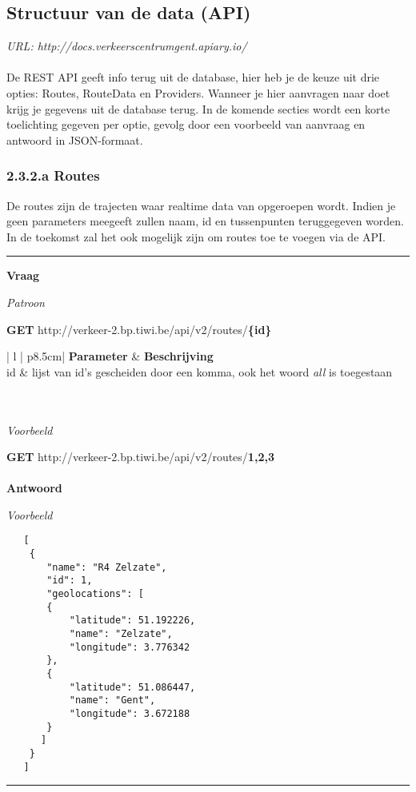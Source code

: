 \documentclass[ps,a4paper,oneside]{report}
\begin{document}
\subsection{Structuur van de data (API)}
\textit{URL: http://docs.verkeerscentrumgent.apiary.io/}\\\\
De REST API geeft info terug uit de database, hier heb je de keuze uit drie opties: Routes, RouteData en Providers. Wanneer je hier aanvragen naar doet krijg je gegevens uit de database terug. In de komende secties wordt een korte toelichting gegeven per optie, gevolg door een voorbeeld van aanvraag en antwoord in JSON-formaat.

\subsubsection{2.3.2.a Routes}
De routes zijn de trajecten waar realtime data van opgeroepen wordt. Indien je geen parameters meegeeft zullen naam, id en tussenpunten teruggegeven worden. In de toekomst zal het ook mogelijk zijn om routes toe te voegen via de API.\\
\noindent\rule[0.5ex]{\linewidth}{1pt}
\textbf{Vraag}

\textit{Patroon}

\textbf{GET} http://verkeer-2.bp.tiwi.be/api/v2/routes/\textbf{\{id\}}\\

\begin{tabular}{ | l | p{8.5cm}| }
	\hline
	\textbf{Parameter} & \textbf{Beschrijving}\\
	\hline
	id & lijst van id's gescheiden door een komma, ook het woord \textit{all} is toegestaan\\
	\hline
\end{tabular}\\\\

\textit{Voorbeeld}

\textbf{GET} http://verkeer-2.bp.tiwi.be/api/v2/routes/\textbf{1,2,3}\\\\
\textbf{Antwoord}

\textit{Voorbeeld}
\begin{verbatim}
   [
    {
       "name": "R4 Zelzate",
       "id": 1,
       "geolocations": [
       {
           "latitude": 51.192226,
           "name": "Zelzate",
           "longitude": 3.776342
       },
       {
           "latitude": 51.086447,
           "name": "Gent",
           "longitude": 3.672188
       }
      ]
    }
   ]\end{verbatim}
\noindent\rule[0.5ex]{\linewidth}{1pt}
\end{document}
